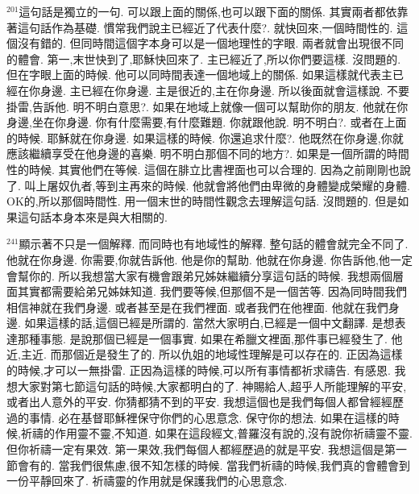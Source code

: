 \documentclass{book}
\begin{document}
$^{201}$這句話是獨立的一句.
可以跟上面的關係,也可以跟下面的關係.
其實兩者都依靠著這句話作為基礎.
慣常我們說主已經近了代表什麼?.
就快回來,一個時間性的.
這個沒有錯的.
但同時間這個字本身可以是一個地理性的字眼.
兩者就會出現很不同的體會.
第一,末世快到了,耶穌快回來了.
主已經近了,所以你們要這樣.
沒問題的.
但在字眼上面的時候.
他可以同時間表達一個地域上的關係.
如果這樣就代表主已經在你身邊.
主已經在你身邊.
主是很近的,主在你身邊.
所以後面就會這樣說.
不要掛雷,告訴他.
明不明白意思?.
如果在地域上就像一個可以幫助你的朋友.
他就在你身邊,坐在你身邊.
你有什麼需要,有什麼難題.
你就跟他說.
明不明白?.
或者在上面的時候.
耶穌就在你身邊.
如果這樣的時候.
你還追求什麼?.
他既然在你身邊,你就應該繼續享受在他身邊的喜樂.
明不明白那個不同的地方?.
如果是一個所謂的時間性的時候.
其實他們在等候.
這個在腓立比書裡面也可以合理的.
因為之前剛剛也說了.
叫上屠奴仇者,等到主再來的時候.
他就會將他們由卑微的身體變成榮耀的身體.
OK的,所以那個時間性.
用一個末世的時間性觀念去理解這句話.
沒問題的.
但是如果這句話本身本來是與大相關的.

$^{241}$顯示著不只是一個解釋.
而同時也有地域性的解釋.
整句話的體會就完全不同了.
他就在你身邊.
你需要,你就告訴他.
他是你的幫助.
他就在你身邊.
你告訴他,他一定會幫你的.
所以我想當大家有機會跟弟兄姊妹繼續分享這句話的時候.
我想兩個層面其實都需要給弟兄姊妹知道.
我們要等候,但那個不是一個苦等.
因為同時間我們相信神就在我們身邊.
或者甚至是在我們裡面.
或者我們在他裡面.
他就在我們身邊.
如果這樣的話,這個已經是所謂的.
當然大家明白,已經是一個中文翻譯.
是想表達那種事態.
是說那個已經是一個事實.
如果在希臘文裡面,那件事已經發生了.
他近,主近.
而那個近是發生了的.
所以仇姐的地域性理解是可以存在的.
正因為這樣的時候,才可以一無掛雷.
正因為這樣的時候,可以所有事情都祈求禱告.
有感恩.
我想大家對第七節這句話的時候,大家都明白的了.
神賜給人,超乎人所能理解的平安,或者出人意外的平安.
你猜都猜不到的平安.
我想這個也是我們每個人都曾經經歷過的事情.
必在基督耶穌裡保守你們的心思意念.
保守你的想法.
如果在這樣的時候,祈禱的作用靈不靈,不知道.
如果在這段經文,普羅沒有說的,沒有說你祈禱靈不靈.
但你祈禱一定有果效.
第一果效,我們每個人都經歷過的就是平安.
我想這個是第一節會有的.
當我們很焦慮,很不知怎樣的時候.
當我們祈禱的時候,我們真的會體會到一份平靜回來了.
祈禱靈的作用就是保護我們的心思意念.
\end{document}
